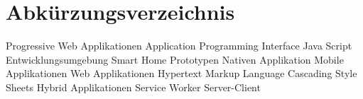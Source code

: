 \chapter*{Abkürzungsverzeichnis}
\pagestyle{plain}

\begin{acronym}[AUTOSAR]

   				{Progressive Web Applikationen}
  				{Application Programming Interface}
  				{Java Script}
  				{Entwicklungsumgebung}
  				{Smart Home Prototypen}
  				{Nativen Applikation}
  				{Mobile Applikationen}
 					{Web Applikationen}
 				{Hypertext Markup Language}
 				{Cascading Style Sheets}
 				{Hybrid Applikationen}
 					{Service Worker}
 					{Server-Client}
\end{acronym}